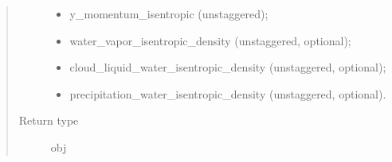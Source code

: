 \documentclass[letterpaper,10pt,english]{sphinxmanual}
\begin{document}
\begin{fulllineitems}
\begin{fulllineitems}
\begin{quote}
\begin{description}
\begin{itemize}
\item {} 
y\_momentum\_isentropic (unstaggered);

\item {} 
water\_vapor\_isentropic\_density (unstaggered, optional);

\item {} 
cloud\_liquid\_water\_isentropic\_density (unstaggered, optional);

\item {} 
precipitation\_water\_isentropic\_density (unstaggered, optional).

\end{itemize}


\item[{Return type}] \leavevmode
obj

\end{description}\end{quote}

\end{fulllineitems}


\end{fulllineitems}

\end{document}
